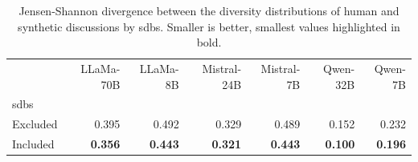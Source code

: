 \begin{table}[ht]
\caption{Jensen-Shannon divergence between the diversity distributions  of human and synthetic discussions by \acp{sdb}. Smaller is better, smallest values highlighted in bold.}
\label{tab:divergence-sdbs}
\begin{tabular}{lrrrrrr}
\toprule
& LLaMa-70B & LLaMa-8B & Mistral-24B & Mistral-7B & Qwen-32B & Qwen-7B \\
\acp{sdb} &  &  &  &  &  &  \\
\midrule
Excluded & 0.395 & 0.492 & 0.329 & 0.489 & 0.152 & 0.232 \\
Included & \textbf{0.356} & \textbf{0.443} & \textbf{0.321} & \textbf{0.443} & \textbf{0.100} & \textbf{0.196} \\
\bottomrule
\end{tabular}
\end{table}
